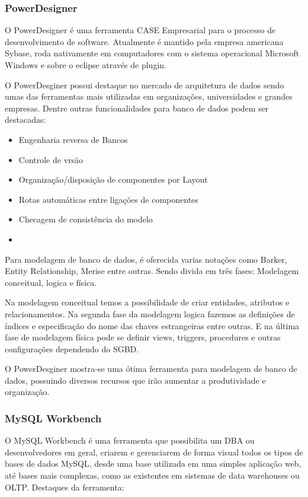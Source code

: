 \documentclass[12pt,a4paper]{article}
\begin{document}
		\subsubsection{PowerDesigner}
			O PowerDesigner é uma ferramenta CASE Empresarial para o processo de desenvolvimento de software. Atualmente é
			mantido pela empresa americana Sybase, roda nativamente em computadores com o sistema operacional Microsoft Windows
			e sobre o eclipse através de plugin.
			
			O PowerDesginer possui destaque no mercado de arquitetura de dados sendo umas das ferramentas mais utilizadas em
			organizações, universidades e grandes empresas. Dentre outras funcionalidades para banco de dados podem ser
			destacadas:
			\begin{itemize}
			  \item Engenharia reversa de Bancos
			  \item Controle de vrsão
			  \item Organização/disposição de componentes por Layout
			  \item Rotas automáticas entre ligações de componentes
			  \item Checagem de consistência do modelo
			  \item
			\end{itemize}
			
			Para modelagem de banco de dados, é oferecida varias notações como Barker, Entity Relationship, Merise entre outras.
			Sendo divida em três fases: Modelagem conceitual, logica e física.

			Na modelagem conceitual temos a possibilidade de criar entidades, atributos e relacionamentos. Na segunda fase da
			modelagem logica fazemos as definições de índices e especificação do nome das chaves estrangeiras entre outras. E na
			última fase de modelagem física pode se definir views, triggers, procedures e outras configurações dependendo do SGBD.

			O PowerDesginer mostra-se uma ótima ferramenta para modelagem de banco de dados, possuindo diversos recursos que
			irão aumentar a produtividade e organização.
			
		\subsubsection{MySQL Workbench}
		
			O MySQL Workbench é uma ferramenta que possibilita um DBA ou desenvolvedores em geral, criarem e gerenciarem de
			forma visual todos os tipos de bases de dados MySQL, desde uma base utilizada em uma simples aplicação web, até bases
			mais complexas, como as existentes em sistemas de data warehouses ou OLTP. Destaques da ferramenta:
			
\end{document}
